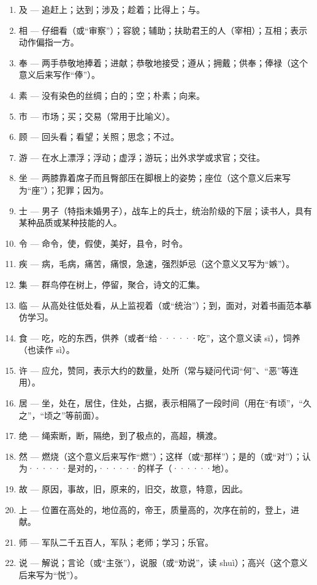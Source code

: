 \begin{enumerate}[label=\textbf{\arabic*. }, start=16]
	\item 及 --- 追赶上；达到；涉及；趁着；比得上；与。
	\item 相 --- 仔细看（或“审察”）；容貌；辅助；扶助君王的人（宰相）；互相；表示动作偏指一方。
	\item 奉 --- 两手恭敬地捧着；进献；恭敬地接受；遵从；拥戴；供奉；俸禄（这个意义后来写作“俸”）。
	\item 素 --- 没有染色的丝绸；白的；空；朴素；向来。
	\item 市 --- 市场；买；交易（常用于比喻义）。
	\item 顾 --- 回头看；看望；关照；思念；不过。
	\item 游 --- 在水上漂浮；浮动；虚浮；游玩；出外求学或求官；交往。
	\item 坐 --- 两膝靠着席子而且臀部压在脚根上的姿势；座位（这个意义后来写为“座”）；犯罪；因为。
	\item 士 --- 男子（特指未婚男子），战车上的兵士，统治阶级的下层；读书人，具有某种品质或某种技能的人。
	\item 令 --- 命令，使，假使，美好，县令，时令。
	\item 疾 --- 病，毛病，痛苦，痛恨，急速，强烈妒忌（这个意义又写为“嫉”）。
	\item 集 --- 群鸟停在树上，停留，聚合，诗文的汇集。
	\item 临 --- 从高处往低处看，从上监视着（或“统治”）；到，面对，对着书画范本摹仿学习。
	\item 食 --- 吃，吃的东西，供养（或者“给······吃”，这个意义读 sī），饲养（也读作 sì）。
	\item 许 --- 应允，赞同，表示大约的数量，处所（常与疑问代词“何”、“恶”等连用）。
	\item 居 --- 坐，处在，居住，住处，占据，表示相隔了一段时间（用在“有顷”，“久之”，“顷之”等前面）。
	\item 绝 --- 绳索断，断，隔绝，到了极点的，高超，横渡。
	\item 然 --- 燃烧（这个意义后来写作“燃”）；这样（或“那样”）；是的（或“对”）；认为······是对的，······的样子（······地）。
	\item 故 --- 原因，事故，旧，原来的，旧交，故意，特意，因此。
	\item 上 --- 位置在高处的，地位高的，帝王，质量高的，次序在前的，登上，进献。
	\item 师 --- 军队二千五百人，军队；老师；学习；乐官。
	\item 说 --- 解说；言论（或“主张”），说服（或“劝说”，读 shuì）；高兴（这个意义后来写为“悦”）。

\end{enumerate}
